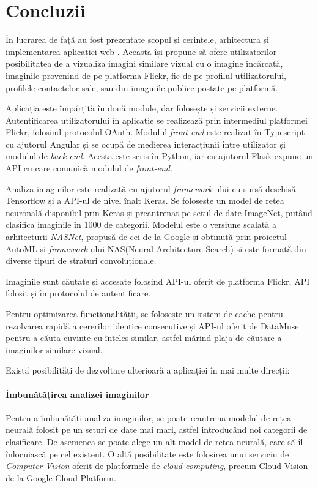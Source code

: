 \chapter*{Concluzii} 

În lucrarea de față au fost prezentate scopul și cerințele, arhitectura și implementarea aplicației web {\applicationtitle}. Aceasta își propune să ofere utilizatorilor posibilitatea de a vizualiza imagini similare vizual cu o imagine încărcată, imaginile provenind de pe platforma Flickr, fie de pe profilul utilizatorului, profilele contactelor sale, sau din imaginile publice postate pe platformă.

Aplicația este împărțită în două module, dar folosește și servicii externe. Autentificarea utilizatorului în aplicație se realizează prin intermediul platformei Flickr, folosind protocolul OAuth.  Modulul \textit{front-end} este realizat în Typescript cu ajutorul Angular și se ocupă de medierea interacțiunii între utilizator și modulul de \textit{back-end}. Acesta este scris în Python, iar cu ajutorul Flask expune un API cu care comunică modulul de \textit{front-end}.

Analiza imaginilor este realizată cu ajutorul \textit{framework}-ului cu sursă deschisă Tensorflow și a API-ul de nivel înalt Keras. Se folosește un model de rețea neuronală disponibil prin Keras și preantrenat pe setul de date ImageNet, putând clasifica imaginile în 1000 de categorii. Modelul este o versiune scalată a arhitecturii \textit{NASNet}, propusă de cei de la Google și obținută prin proiectul AutoML și \textit{framework}-ului NAS(Neural Architecture Search) și este formată din diverse tipuri de straturi convoluționale.

Imaginile sunt căutate și accesate folosind API-ul oferit de platforma Flickr, API folosit și în protocolul de autentificare.

Pentru optimizarea funcționalității, se folosește un sistem de cache pentru rezolvarea rapidă a cererilor identice consecutive și API-ul oferit de DataMuse pentru a căuta cuvinte cu înțeles similar, astfel mărind plaja de căutare a imaginilor similare vizual.

Există posibilități de dezvoltare ulterioară a aplicației în mai multe direcții:

\subsubsection{Îmbunătățirea analizei imaginilor}
Pentru a îmbunătăți analiza imaginilor, se poate reantrena modelul de rețea neurală folosit pe un seturi de date mai mari, astfel introducând noi categorii de clasificare. De asemenea se poate alege un alt model de rețea neurală, care să îl înlocuiască pe cel existent. O altă posibilitate este folosirea unui serviciu de \textit{Computer Vision} oferit de platformele de \textit{cloud computing}, precum Cloud Vision de la Google Cloud Platform.


